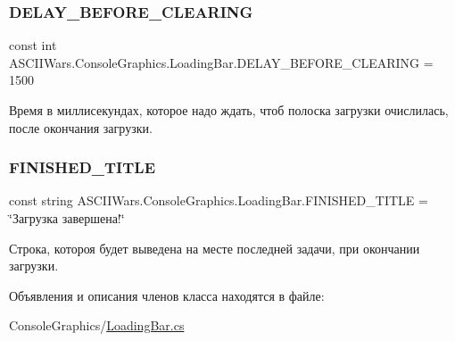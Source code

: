 \hypertarget{class_a_s_c_i_i_wars_1_1_console_graphics_1_1_loading_bar_ae05f622988d5cebaa3e0c14d45d832fb}{}\label{class_a_s_c_i_i_wars_1_1_console_graphics_1_1_loading_bar_ae05f622988d5cebaa3e0c14d45d832fb} 
\subsubsection{\texorpdfstring{D\+E\+L\+A\+Y\+\_\+\+B\+E\+F\+O\+R\+E\+\_\+\+C\+L\+E\+A\+R\+I\+NG}{DELAY\_BEFORE\_CLEARING}}
{\footnotesize\ttfamily const int A\+S\+C\+I\+I\+Wars.\+Console\+Graphics.\+Loading\+Bar.\+D\+E\+L\+A\+Y\+\_\+\+B\+E\+F\+O\+R\+E\+\_\+\+C\+L\+E\+A\+R\+I\+NG = 1500\hspace{0.3cm}{\ttfamily [private]}}

Время в миллисекундах, которое надо ждать, чтоб полоска загрузки очислилась, после окончания загрузки. \hypertarget{class_a_s_c_i_i_wars_1_1_console_graphics_1_1_loading_bar_aa75543e5166964ca32750bb66591ab3d}{}\label{class_a_s_c_i_i_wars_1_1_console_graphics_1_1_loading_bar_aa75543e5166964ca32750bb66591ab3d} 
\subsubsection{\texorpdfstring{F\+I\+N\+I\+S\+H\+E\+D\+\_\+\+T\+I\+T\+LE}{FINISHED\_TITLE}}
{\footnotesize\ttfamily const string A\+S\+C\+I\+I\+Wars.\+Console\+Graphics.\+Loading\+Bar.\+F\+I\+N\+I\+S\+H\+E\+D\+\_\+\+T\+I\+T\+LE = \char`\"{}Загрузка завершена!\char`\"{}\hspace{0.3cm}{\ttfamily [private]}}

Строка, котороя будет выведена на месте последней задачи, при окончании загрузки. 

Объявления и описания членов класса находятся в файле\+:\begin{DoxyCompactItemize}
\item 
Console\+Graphics/\hyperlink{_loading_bar_8cs}{Loading\+Bar.\+cs}\end{DoxyCompactItemize}
